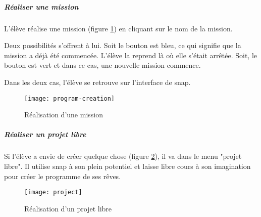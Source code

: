 \subparagraph{Réaliser une mission} L'élève réalise une \gls{mission} (figure \ref{fig:program-creation}) en cliquant sur le nom de la \gls{mission}.

Deux possibilités s'offrent à lui. Soit le bouton est bleu, ce qui signifie que la \gls{mission} a déjà été commencée. L'élève la reprend là où elle s'était arrêtée. Soit, le bouton est vert et dans ce cas, une nouvelle \gls{mission} commence.

Dans les deux cas, l'élève se retrouve sur l'interface de \gls{snap}.
\begin{figure}
  \begin{center}
    \texttt{[image: program-creation]}
    \caption{Réalisation d'une mission}
    \label{fig:program-creation}
  \end{center}
\end{figure}

\subparagraph{Réaliser un projet libre} Si l'élève a envie de créer quelque chose (figure \ref{fig:project}), il va dans le menu "projet libre". Il utilise \gls{snap} à son plein potentiel et laisse libre cours à son imagination pour créer le programme de ses rêves.
\begin{figure}
  \begin{center}
    \texttt{[image: project]}
    \caption{Réalisation d'un projet libre}
    \label{fig:project}
  \end{center}
\end{figure}

